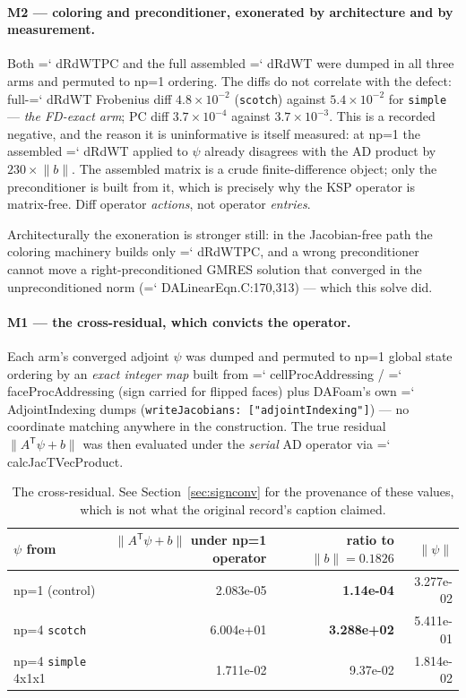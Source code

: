 \documentclass[11pt,a4paper]{article}
\newcommand{\artifact}[1]{{\small\ttfamily\hyphenchar\font=`\-\relax
  \def\_{\textunderscore\allowbreak}#1}}
\begin{document}
\paragraph{M2 --- coloring and preconditioner, exonerated by architecture and by
measurement.} Both \artifact{dRdWTPC} and the full assembled \artifact{dRdWT} were dumped in
all three arms and permuted to np=1 ordering. The diffs do not correlate with the defect:
full-\artifact{dRdWT} Frobenius diff \(4.8\times10^{-2}\) (\texttt{scotch}) against
\(5.4\times10^{-2}\) for \texttt{simple} --- \emph{the FD-exact arm}; PC diff
\(3.7\times10^{-4}\) against \(3.7\times10^{-3}\). This is a recorded negative, and the
reason it is uninformative is itself measured: at np=1 the assembled \artifact{dRdWT} applied
to \(\psi\) already disagrees with the AD product by \(230\times\lVert b\rVert\). The
assembled matrix is a crude finite-difference object; only the preconditioner is built from
it, which is precisely why the KSP operator is matrix-free. Diff operator \emph{actions},
not operator \emph{entries}.

Architecturally the exoneration is stronger still: in the Jacobian-free path the coloring
machinery builds only \artifact{dRdWTPC}, and a wrong preconditioner cannot move a
right-preconditioned GMRES solution that converged in the unpreconditioned norm
(\artifact{DALinearEqn.C:170,313}) --- which this solve did.

\paragraph{M1 --- the cross-residual, which convicts the operator.} Each arm's converged
adjoint \(\psi\) was dumped and permuted to np=1 global state ordering by an \emph{exact
integer map} built from \artifact{cellProcAddressing} / \artifact{faceProcAddressing} (sign
carried for flipped faces) plus DAFoam's own \artifact{AdjointIndexing} dumps
(\texttt{writeJacobians: ["adjointIndexing"]}) --- no coordinate matching anywhere in the
construction. The true residual \(\lVert A^{\mathsf T}\psi + b\rVert\) was then evaluated
under the \emph{serial} AD operator via \artifact{calcJacTVecProduct}.

\begin{table}[htbp]
\centering\small
\begin{tabular}{@{}lrrr@{}}
\toprule
\(\psi\) from & \(\lVert A^{\mathsf T}\psi + b\rVert\) under np=1 operator & ratio to \(\lVert b\rVert=0.1826\) & \(\lVert\psi\rVert\) \\
\midrule
np=1 (control)             & 2.083e-05 & \textbf{1.14e-04} & 3.277e-02 \\
np=4 \texttt{scotch}       & 6.004e+01 & \textbf{3.288e+02} & 5.411e-01 \\
np=4 \texttt{simple} 4x1x1 & 1.711e-02 & 9.37e-02          & 1.814e-02 \\
\bottomrule
\end{tabular}
\caption{The cross-residual. See Section~\ref{sec:signconv} for the provenance of these
values, which is not what the original record's caption claimed.}
\label{tab:crossres}
\end{table}
\end{document}
